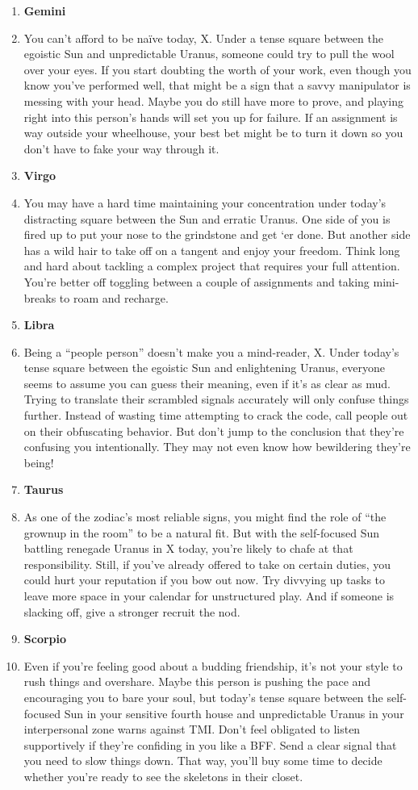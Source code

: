 \documentclass{article}[twocolumn]
\newcommand{\bb}[1]{\item[] \textbf{#1}}
\begin{document}
\begin{multicols}{2}
\begin{enumerate}
     \bb{Gemini}
    \item You can’t afford to be naïve today, X. Under a tense square between the egoistic Sun and unpredictable Uranus, someone could try to pull the wool over your eyes. If you start doubting the worth of your work, even though you know you’ve performed well, that might be a sign that a savvy manipulator is messing with your head. Maybe you do still have more to prove, and playing right into this person’s hands will set you up for failure. If an assignment is way outside your wheelhouse, your best bet might be to turn it down so you don’t have to fake your way through it.
     \bb{Virgo}
    \item You may have a hard time maintaining your concentration under today’s distracting square between the Sun and erratic Uranus. One side of you is fired up to put your nose to the grindstone and get ‘er done. But another side has a wild hair to take off on a tangent and enjoy your freedom. Think long and hard about tackling a complex project that requires your full attention. You’re better off toggling between a couple of assignments and taking mini-breaks to roam and recharge.
     \bb{Libra}
    \item Being a “people person” doesn’t make you a mind-reader, X. Under today’s tense square between the egoistic Sun and enlightening Uranus, everyone seems to assume you can guess their meaning, even if it’s as clear as mud. Trying to translate their scrambled signals accurately will only confuse things further. Instead of wasting time attempting to crack the code, call people out on their obfuscating behavior. But don’t jump to the conclusion that they’re confusing you intentionally. They may not even know how bewildering they’re being!
     \bb{Taurus}
    \item As one of the zodiac’s most reliable signs, you might find the role of “the grownup in the room” to be a natural fit. But with the self-focused Sun battling renegade Uranus in X today, you’re likely to chafe at that responsibility. Still, if you’ve already offered to take on certain duties, you could hurt your reputation if you bow out now. Try divvying up tasks to leave more space in your calendar for unstructured play. And if someone is slacking off, give a stronger recruit the nod.
     \bb{Scorpio}
    \item Even if you’re feeling good about a budding friendship, it’s not your style to rush things and overshare. Maybe this person is pushing the pace and encouraging you to bare your soul, but today’s tense square between the self-focused Sun in your sensitive fourth house and unpredictable Uranus in your interpersonal zone warns against TMI. Don’t feel obligated to listen supportively if they’re confiding in you like a BFF. Send a clear signal that you need to slow things down. That way, you’ll buy some time to decide whether you’re ready to see the skeletons in their closet.

\end{enumerate}
\end{multicols}
\end{document}
